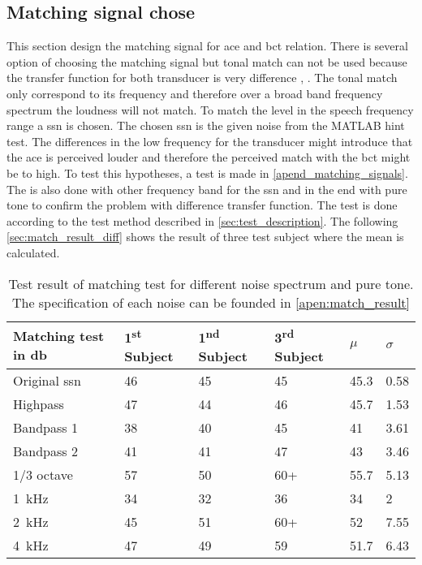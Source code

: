 \subsection{Matching signal chose}
\label{sec:match_sig_cho}
This section design the matching signal for \gls{ace} and \gls{bct} relation. There is several option of choosing the matching signal but tonal match can not be used because the transfer function for both transducer is very difference \citep{microPro_er4},  \citep{radioear_b81}. The tonal match only correspond to its frequency and therefore over a broad band frequency spectrum the loudness will not match. To match the level in the speech frequency range a \gls{ssn} is chosen. The chosen \gls{ssn} is the given noise from the MATLAB \gls{hint} test. The differences in the low frequency for the transducer might introduce that the \gls{ace} is perceived louder and therefore the perceived match with the \gls{bct} might be to high. To test this hypotheses, a test is made in \autoref{apend_matching_signals}. The is also done with other frequency band for the \gls{ssn} and in the end with pure tone to confirm the problem with difference transfer function. The test is done according to the test method described in \autoref{sec:test_description}. The following \autoref{sec:match_result_diff} shows the result of three test subject where the mean is calculated.

\begin{table}[H]
\centering
\caption{Test result of matching test for different noise spectrum and pure tone. The specification of each noise can be founded in \autoref{apen:match_result}}
\begin{tabular}{l|lll|ll}
Matching test in \si{\decibel}       & 1\textsuperscript{st}  Subject & 1\textsuperscript{nd}  Subject & 3\textsuperscript{rd}  Subject & $\mu$ & $\sigma$ \\ \hline
Original \gls{ssn}         & 46        & 45        & 45        & 45.3        & 0.58               \\
Highpass         & 47        & 44        & 46        & 45.7        & 1.53               \\
Bandpass 1         & 38        & 40        & 45        & 41          & 3.61               \\
Bandpass 2        & 41        & 41        & 47        & 43          & 3.46               \\
1/3 octave & 57        & 50        & 60+       & 55.7        & 5.13               \\
\SI{1}{\kilo\hertz}                   & 34        & 32        & 36        & 34          & 2                  \\
\SI{2}{\kilo\hertz}                  & 45        & 51        & 60+       & 52          & 7.55               \\
\SI{4}{\kilo\hertz}                  & 47        & 49        & 59        & 51.7        &  6.43                 
\end{tabular}
\label{sec:match_result_diff}
\end{table}


